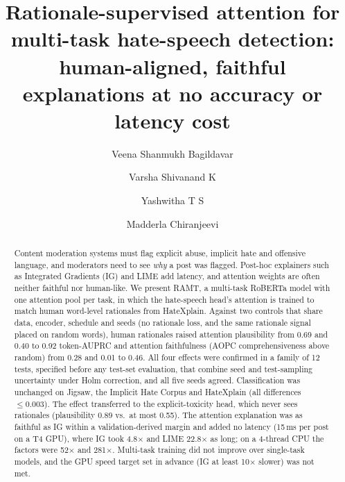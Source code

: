 \documentclass[preprint,12pt,authoryear]{elsarticle}
\begin{document}
\begin{frontmatter}

\title{Rationale-supervised attention for multi-task hate-speech detection: human-aligned, faithful explanations at no accuracy or latency cost}

\author[inst1]{Veena Shanmukh Bagildavar}
\author[inst1]{Varsha Shivanand K}
\author[inst1]{Yashwitha T S}
\author[inst1]{Madderla Chiranjeevi}

\begin{abstract}
Content moderation systems must flag explicit abuse, implicit hate and offensive language, and moderators need to see \emph{why} a post was flagged. Post-hoc explainers such as Integrated Gradients (IG) and LIME add latency, and attention weights are often neither faithful nor human-like. We present RAMT, a multi-task RoBERTa model with one attention pool per task, in which the hate-speech head's attention is trained to match human word-level rationales from HateXplain. Against two controls that share data, encoder, schedule and seeds (no rationale loss, and the same rationale signal placed on random words), human rationales raised attention plausibility from 0.69 and 0.40 to 0.92 token-AUPRC and attention faithfulness (AOPC comprehensiveness above random) from 0.28 and 0.01 to 0.46. All four effects were confirmed in a family of 12 tests, specified before any test-set evaluation,  that combine seed and test-sampling uncertainty under Holm correction, and all five seeds agreed. Classification was unchanged on Jigsaw, the Implicit Hate Corpus and HateXplain (all differences $\le 0.003$). The effect transferred to the explicit-toxicity head, which never sees rationales (plausibility 0.89 vs.\ at most 0.55). The attention explanation was as faithful as IG within a validation-derived margin and added no latency (15\,ms per post on a T4 GPU), where IG took 4.8$\times$ and LIME 22.8$\times$ as long; on a 4-thread CPU the factors were 52$\times$ and 281$\times$. Multi-task training did not improve over single-task models, and the GPU speed target set in advance (IG at least 10$\times$ slower) was not met.
\end{abstract}


\end{frontmatter}
\end{document}
